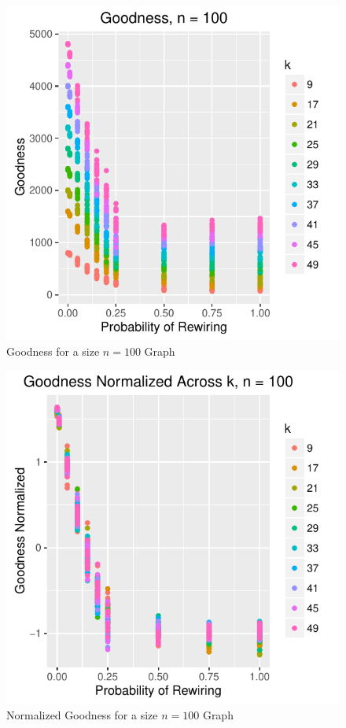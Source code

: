 \documentclass{article}
\begin{document}
\begin{figure}
\centering
\includegraphics[width=1\textwidth]{1-G_n100.pdf}
\caption{\label{fig:G}Goodness for a size $n = 100$ Graph}
\end{figure}

\begin{figure}
\centering
\includegraphics[width=1\textwidth]{2-G_norm_n100.pdf}
\caption{\label{fig:Gnorm}Normalized Goodness for a size $n = 100$ Graph}
\end{figure}
\end{document}
